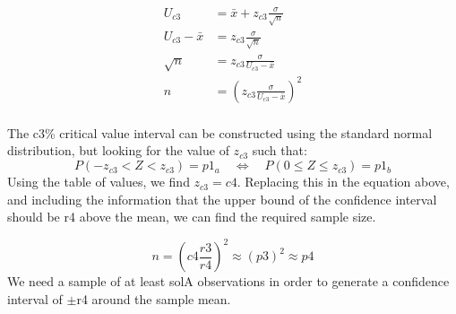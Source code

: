\documentclass[preview]{standalone}
\begin{document}
\[
\begin{aligned}
U_{{c3}} & = \bar x + z_{{c3}} \frac{\sigma}{\sqrt{n}}\\
U_{{c3}} - \bar x  & = z_{{c3}} \frac{\sigma}{\sqrt{n}}\\
\sqrt{n} & =z_{{c3}} \frac{\sigma}{U_{{c3}} - \bar x} \\
n & = \left(z_{{c3}} \frac{\sigma}{U_{{c3}} - \bar x}\right)^2 \\
\end{aligned}
\]

The {c3}\% critical value interval can be constructed using the standard normal distribution, but looking for the value of $z_{{c3}}$ such that:
\[
P(-z_{{c3}} < Z < z_{{c3}}) = {p1_a} \quad \iff \quad P(0 \le Z \le z_{{c3}}) = {p1_b}
\]
Using the table of values, we find $z_{{c3}} = {c4}$. Replacing this in the equation above, and including the information that the upper bound of the confidence interval should be {r4} above the mean, we can find the required sample size.

\[
n = \left({c4} \frac{{r3}}{{r4}}\right)^2 \approx \left({p3}\right)^2 \approx {p4}
\]
We need a sample of at least {solA} observations in order to generate a confidence interval of $\pm${r4} around the sample mean.

\end{document}
